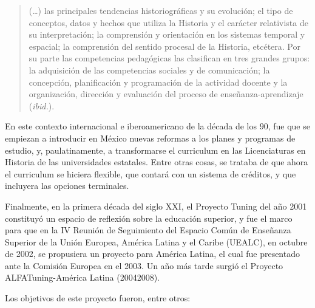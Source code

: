 \begin{quotation}
(\ldots) las principales tendencias historiográficas y su evolución; el tipo de conceptos, datos y hechos que utiliza la Historia y el carácter relativista
de su interpretación; la comprensión y orientación en los sistemas temporal
y espacial; la comprensión del sentido procesal de la Historia, etcétera.
Por su parte las competencias pedagógicas las clasifican en tres grandes
grupos: la adquisición de las competencias sociales y de comunicación; la
concepción, planificación y programación de la actividad docente y la
organización, dirección y evaluación del proceso de enseñanza-aprendizaje
(\textit{ibid.}).
\end{quotation}

En este contexto internacional e iberoamericano de la década de los 
$90$, fue
que se empiezan a introducir en México nuevas reformas a los planes y programas de
estudio, y, paulatinamente, a transformarse el curriculum en las Licenciaturas en Historia 
de las universidades estatales. Entre otras cosas, se trataba de que ahora el curriculum se hiciera
flexible, que contará con un sistema de créditos, y que incluyera las opciones terminales.

Finalmente, en la primera década del siglo XXI, el Proyecto Tuning del año
2001 constituyó un espacio de reflexión sobre la educación superior, y
fue el marco para que en la IV Reunión de Seguimiento del Espacio Común de
Enseñanza Superior de la Unión Europea, América Latina y el Caribe (UEALC),
en octubre de 2002, se propusiera un proyecto para América Latina, el cual fue
presentado ante la Comisión Europea en el 2003. Un año más tarde surgió el
Proyecto ALFATuning-América Latina (2004\textendash{}2008).

\enlargethispage{1\baselineskip}
Los objetivos de este proyecto fueron, entre otros:

